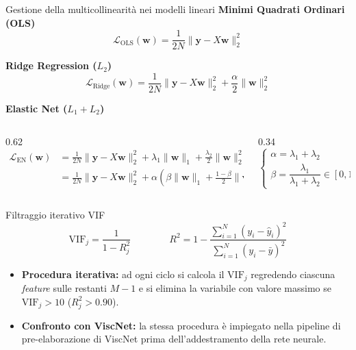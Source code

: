 \documentclass[10pt, aspectratio=169, table]{beamer}
\begin{document}
	\begin{frame}{Gestione della multicollinearità nei modelli lineari}
		\small
		\textbf{Minimi Quadrati Ordinari (OLS)}
		$$\mathcal{L}_{\text{OLS}}(\mathbf{w}) = \frac{1}{2N}\|\mathbf{y} - X\mathbf{w}\|_2^2$$
		
		\vspace{0.25cm}
		\textbf{Ridge Regression ($L_2$)}
		$$\mathcal{L}_{\text{Ridge}}(\mathbf{w}) = \frac{1}{2N}\|\mathbf{y} - X\mathbf{w}\|_2^2 + \frac{\alpha}{2}\|\mathbf{w}\|_2^2$$
		
		\vspace{0.25cm}
		\textbf{Elastic Net ($L_1 + L_2$)}
		\vspace{-0.2cm}
		\begin{columns}[c]
			\begin{column}{0.62\textwidth}
				$$\begin{aligned}
					\mathcal{L}_{\text{EN}}(\mathbf{w}) &= \frac{1}{2N}\|\mathbf{y} - X\mathbf{w}\|_2^2 + \lambda_1 \|\mathbf{w}\|_1 + \frac{\lambda_2}{2} \|\mathbf{w}\|_2^2 \\[0.2cm]
					&= \frac{1}{2N}\|\mathbf{y} - X\mathbf{w}\|_2^2 + \alpha \left( \beta \|\mathbf{w}\|_1 + \frac{1-\beta}{2} \|\mathbf{w}\|_2^2 \right)
				\end{aligned}$$
			\end{column}
			\begin{column}{0.34\textwidth}
				$$\begin{cases}
					\alpha = \lambda_1 + \lambda_2 \\[0.2cm]
					\beta = \dfrac{\lambda_1}{\lambda_1 + \lambda_2} \in [0, 1]
				\end{cases}$$
			\end{column}
		\end{columns}
	\end{frame}
	
	\begin{frame}{Filtraggio iterativo VIF}
		\small
		$$\text{VIF}_j = \frac{1}{1 - R_j^2} \qquad \qquad R^2 = 1 - \frac{\sum_{i=1}^{N} (y_i - \hat{y}_i)^2}{\sum_{i=1}^{N} (y_i - \bar{y})^2}$$
		\vspace{0.3cm}
		\begin{itemize}
			\item \textbf{Procedura iterativa:} ad ogni ciclo si calcola il $\text{VIF}_j$ regredendo ciascuna \textit{feature} sulle restanti $M-1$ e si elimina la variabile con valore massimo se $\text{VIF}_j > 10$ ($R_j^2 > 0.90$).
			\vspace{0.25cm}
			\item \textbf{Confronto con ViscNet:} la stessa procedura è impiegato nella pipeline di pre-elaborazione di ViscNet prima dell'addestramento della rete neurale.
		\end{itemize}
	\end{frame}
	
\end{document}
